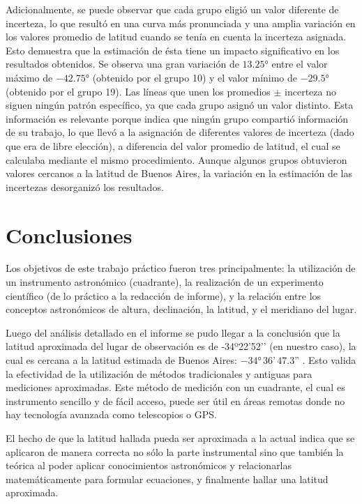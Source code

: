 \documentclass[11pt, a4paper]{article} %
\begin{document}
Adicionalmente, se puede observar que cada grupo eligió un valor diferente de incerteza, lo que resultó en una curva más pronunciada y una amplia variación en los valores promedio de latitud cuando se tenía en cuenta la incerteza asignada. Esto demuestra que la estimación de ésta tiene un impacto significativo en los resultados obtenidos. Se observa una gran variación de $\ang{13.25}$ entre el valor máximo de $-\ang{42.75}$ (obtenido por el grupo 10) y el valor mínimo de $-\ang{29.5}$ (obtenido por el grupo 19). Las líneas que unen los promedios $\pm$ incerteza no siguen ningún patrón específico, ya que cada grupo asignó un valor distinto. Esta información es relevante porque indica que ningún grupo compartió información de su trabajo, lo que llevó a la asignación de diferentes valores de incerteza (dado que era de libre elección), a diferencia del valor promedio de latitud, el cual se calculaba mediante el mismo procedimiento. Aunque algunos grupos obtuvieron valores cercanos a la latitud de Buenos Aires, la variación en la estimación de las incertezas desorganizó los resultados.

\section{Conclusiones}
Los objetivos de este trabajo práctico fueron tres principalmente: la utilización de un instrumento astronómico (cuadrante), la realización de un experimento científico (de lo práctico a la redacción de informe), y la relación entre los conceptos astronómicos de altura, declinación, la latitud, y el meridiano del lugar. 

Luego del análisis detallado en el informe se pudo llegar a la conclusión que la latitud aproximada del lugar de observación es de -34º22’52’’ (en nuestro caso), la cual es cercana a la latitud estimada de Buenos Aires: $-\ang{34} \, 36\text{'} \, 47.3\text{''}$ {\cite{geodatosCoordenadasGeogrxE1ficas}}. 
Esto valida la efectividad de la utilización de métodos tradicionales y antiguas para mediciones aproximadas. Este método de medición con un cuadrante, el cual es instrumento sencillo y de fácil acceso, puede ser útil en áreas remotas donde no hay tecnología avanzada como telescopios o GPS. 

El hecho de que la latitud hallada pueda ser aproximada a la actual indica que se aplicaron de manera correcta no sólo la parte instrumental sino que también la teórica al poder aplicar conocimientos astronómicos y relacionarlas matemáticamente para formular ecuaciones, y finalmente hallar una latitud aproximada. 
\end{document}
